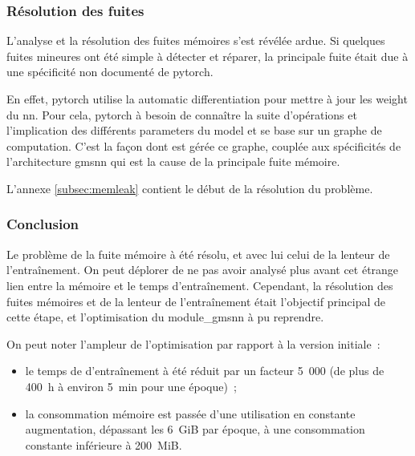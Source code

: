 \subsubsection{Résolution des fuites}
L'analyse et la résolution des fuites mémoires s'est révélée ardue. Si quelques fuites mineures ont été simple à détecter et réparer, la principale fuite était due à une spécificité non documenté de \gls{pytorch}.

En effet, \gls{pytorch} utilise la \gls{automatic differentiation} pour mettre à jour les \gls{weight} du \gls{nn}.
Pour cela, \gls{pytorch} à besoin de connaître la suite d'opérations et l'implication des différents \glspl{parameter} du \gls{model} et se base sur un \og graphe de computation\fg{}.
C'est la façon dont est gérée ce graphe, couplée aux spécificités de l'architecture \gls{gmsnn} qui est la cause de la principale fuite mémoire.

L'annexe \ref{subsec:memleak} contient le début de la résolution du problème.

\subsubsection{Conclusion}
Le problème de la fuite mémoire à été résolu, et avec lui celui de la lenteur de l'entraînement.
On peut déplorer de ne pas avoir analysé plus avant cet étrange lien entre la mémoire et le temps d'entraînement.
Cependant, la résolution des fuites mémoires et de la lenteur de l'entraînement était l'objectif principal de cette étape, et l'optimisation du \gls{module_gmsnn} à pu reprendre.

On peut noter l'ampleur de l'optimisation par rapport à la version initiale~:
\begin{itemize}
	\item le temps de d'entraînement à été réduit par un facteur 5~000 (de plus de 400~h à environ 5~min pour une époque)~;
	\item la consommation mémoire est passée d'une utilisation en constante augmentation, dépassant les 6~GiB par époque, à une consommation constante inférieure à 200~MiB.
\end{itemize}
